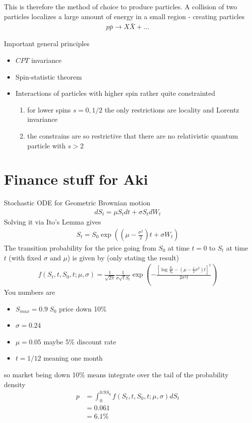 \documentclass[10pt,a4paper]{article}
\theoremstyle{definition}
\begin{document}
This is therefore the method of choice to produce particles. A collision of two particles localizes a large amount of energy in a small region - creating particles
\begin{align}
    p\bar{p}\rightarrow X\bar{X}+ ...
\end{align}

Important general principles
\begin{itemize}
    \item $CPT$ invariance
    \item Spin-statistic theorem
    \item Interactions of particles with higher spin rather quite constrainted
    \begin{enumerate}
        \item for lower spins $s=0, 1/2$ the only restrictions are locality and Lorentz invariance
        \item the constrains are so restrictive that there are no relativistic quantum particle with $s>2$
    \end{enumerate}
\end{itemize}

\newpage
\section{Finance stuff for Aki}
Stochastic ODE for Geometric Brownian motion
\begin{align}
 dS_t=\mu S_t dt+\sigma S_t dW_t
\end{align}
Solving it via Ito's Lemma gives
\begin{align}
 S_t=S_0 \exp\left(\left(\mu-\frac{\sigma^2}{2}\right)t+\sigma W_t\right)
\end{align}
The transition probability for the price going from $S_0$ at time $t=0$ to $S_t$ at time $t$ (with fixed $\sigma$ and $\mu$) is given by (only stating the result)
\begin{align}
f(S_t,t,S_0,t;\mu,\sigma)=\frac{1}{\sqrt{2\pi}}\frac{1}{\sigma\sqrt{t} S_t}\exp\left(-\frac{\left[\log\frac{S_t}{S_0}-\left(\mu-\frac{1}{2}\sigma^2\right)t\right]^2}{2\sigma^2 t}\right)
\end{align}
You numbers are
\begin{itemize}
\item $S_{max}=0.9\; S_0$ price down 10\%
\item $\sigma=0.24$
\item $\mu=0.05$ maybe 5\% discount rate
\item $t=1/12$ meaning one month
\end{itemize}
so market being down 10\% means integrate over the tail of the probability density 
\begin{align}
p&=\int_0^{0.9S_0} f(S_t,t,S_0,t;\mu,\sigma) dS_t\\
&=0.061\\
&=6.1\%
\end{align}
\end{document}

